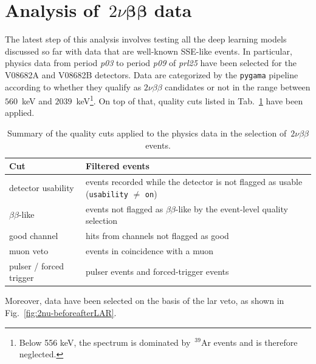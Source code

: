 \newpage
\section{Analysis of~\texorpdfstring{$2\nu\boldsymbol{\beta}\boldsymbol{\beta}$}{2nu beta beta} data}
\label{sec:2nubb-data}

The latest step of this analysis involves testing all the deep learning models discussed so far with data that are well-known \ac{SSE}-like events. In particular, physics data from period \textit{p03} to period \textit{p09} of \textit{prl25} have been selected for the V08682A and V08682B detectors. Data are categorized by the \texttt{pygama} pipeline according to whether they qualify as $2\nu\beta\beta$ candidates or not in the range between $560$~keV and $2039$~keV\footnote{Below 556 keV, the spectrum is dominated by~${}^{39}$Ar events and is therefore neglected.}. On top of that, quality cuts listed in Tab.~\ref{tab:quality-cuts-2nu} have been applied.

\begin{table}[H]
    \centering
    \begin{tabular}{ll}
        \toprule
        \textbf{Cut} & \textbf{Filtered events} \\
        \midrule
        detector usability      & events recorded while the detector is not flagged as usable (\texttt{usability} $\neq$ \texttt{on}) \\
        $\beta\beta$-like       & events not flagged as $\beta\beta$-like by the event-level quality selection \\
        good channel            & hits from channels not flagged as good \\
        muon veto               & events in coincidence with a muon \\
        pulser / forced trigger & pulser events and forced-trigger events \\
        \bottomrule
    \end{tabular}
    \caption{Summary of the quality cuts applied to the physics data in the selection of~$2\nu\beta\beta$ events.}
    \label{tab:quality-cuts-2nu}
\end{table}

Moreover, data have been selected on the basis of the \ac{lar} veto, as shown in Fig.~\ref{fig:2nu-beforeafterLAR}.

